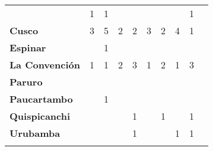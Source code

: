 \begin{tabular}{lccccccccc}
	&1											&1
	&\cellcolor[HTML]{FCC46C}					&\cellcolor[HTML]{FCC46C}
	&\cellcolor[HTML]{FCC46C}					&\cellcolor[HTML]{FCC46C}
	&\cellcolor[HTML]{FCC46C}					&1\\
	\textbf{Cusco}                            													
	&3											&5											
	&2											&2		
	&3											&2
	&4											&1\\								
	\textbf{Espinar}       					             									
	&\cellcolor[HTML]{FCC46C}					&1
	&\cellcolor[HTML]{FCC46C}					&\cellcolor[HTML]{FCC46C}
	&\cellcolor[HTML]{FCC46C}					&\cellcolor[HTML]{FCC46C}
	&\cellcolor[HTML]{FCC46C}					&\cellcolor[HTML]{FCC46C}\\	
	\textbf{La Convención}                      					
	&1											&1											&2											&3											
	&1											&2											
	&1											&3\\	
	\textbf{Paruro}                            					
	&\cellcolor[HTML]{FCC46C}					&\cellcolor[HTML]{FCC46C}					&\cellcolor[HTML]{FCC46C}					&\cellcolor[HTML]{FCC46C}					&\cellcolor[HTML]{FCC46C}					&\cellcolor[HTML]{FCC46C}
	&\cellcolor[HTML]{FCC46C} 					&\cellcolor[HTML]{FCC46C}\\
	\textbf{Paucartambo}               		                       							
	&\cellcolor[HTML]{FCC46C}					&1
	&\cellcolor[HTML]{FCC46C}					&\cellcolor[HTML]{FCC46C}
	&\cellcolor[HTML]{FCC46C}					&\cellcolor[HTML]{FCC46C}
	&\cellcolor[HTML]{FCC46C}					&\cellcolor[HTML]{FCC46C}\\
	\textbf{Quispicanchi}                                         	      					
	&\cellcolor[HTML]{FCC46C}					&\cellcolor[HTML]{FCC46C}					&\cellcolor[HTML]{FCC46C}					&1											&\cellcolor[HTML]{FCC46C}					&1											&\cellcolor[HTML]{FCC46C}					&1\\
	\textbf{Urubamba}                                                      	
	&\cellcolor[HTML]{FCC46C}					&\cellcolor[HTML]{FCC46C}					&\cellcolor[HTML]{FCC46C}					&1											&\cellcolor[HTML]{FCC46C}					&\cellcolor[HTML]{FCC46C}					&1											&1	\\						
	&\multicolumn{1}{l}{}                       &\multicolumn{1}{l}{}            &\multicolumn{1}{l}{}                         
	&\multicolumn{1}{l}{}                       &\multicolumn{1}{l}{}            &\multicolumn{1}{l}{}                       &\multicolumn{1}{l}{}                       &\multicolumn{1}{l}{}            			    
\end{tabular}